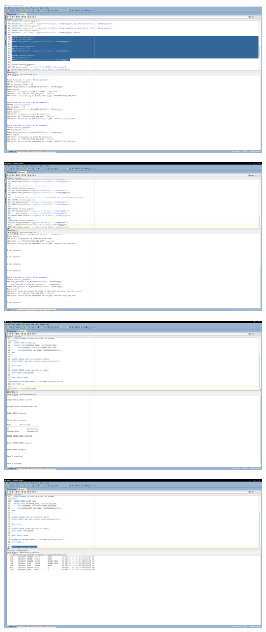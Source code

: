 \documentclass[12pt, a4paper]{article}
\begin{document}
\includegraphics[width=\textwidth]{11_2.png}

\includegraphics[width=\textwidth]{11_3.png}

\includegraphics[width=\textwidth]{12_1.png}

\includegraphics[width=\textwidth]{12_2.png}
\end{document}
